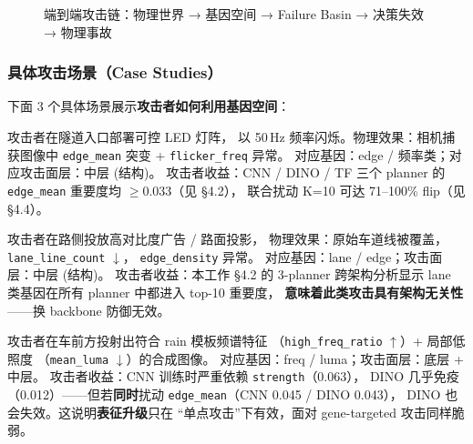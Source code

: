 \documentclass[a4paper,12pt,fontset=fandol]{ctexart}
\newcommand{\gene}[1]{\texttt{#1}}
\begin{document}
\begin{figure}[H]
\caption{端到端攻击链：物理世界 → 基因空间 → Failure Basin → 决策失效 → 物理事故}
\label{fig:attack_chain}
\end{figure}

\subsubsection{具体攻击场景（Case Studies）}

\noindent 下面 3 个具体场景展示\textbf{攻击者如何利用基因空间}：

\begin{description}[leftmargin=1.4em,style=nextline]
\item[\textbf{场景 S1 — 隧道入口 LED 闪烁攻击}]
  攻击者在隧道入口部署可控 LED 灯阵，
  以 50\,Hz 频率闪烁。物理效果：相机捕获图像中
  \gene{edge\_mean} 突变 + \gene{flicker\_freq} 异常。
  对应基因：edge / 频率类；对应攻击面层：中层 (结构)。
  攻击者收益：CNN / DINO / TF 三个 planner 的
  \gene{edge\_mean} 重要度均 $\geq 0.033$（见 §4.2），
  联合扰动 K=10 可达 71--100\% flip（见 §4.4）。

\item[\textbf{场景 S2 — 路面广告覆盖车道线攻击}]
  攻击者在路侧投放高对比度广告 / 路面投影，
  物理效果：原始车道线被覆盖，\gene{lane\_line\_count} $\downarrow$，
  \gene{edge\_density} 异常。
  对应基因：lane / edge；攻击面层：中层 (结构)。
  攻击者收益：本工作 §4.2 的 3-planner 跨架构分析显示
  lane 类基因在所有 planner 中都进入 top-10 重要度，
  \textbf{意味着此类攻击具有架构无关性}——换 backbone 防御无效。

\item[\textbf{场景 S3 — 雨夜对抗贴纸 / 投影攻击}]
  攻击者在车前方投射出符合 rain 模板频谱特征
  （\gene{high\_freq\_ratio} $\uparrow$）+ 局部低照度
  （\gene{mean\_luma} $\downarrow$）的合成图像。
  对应基因：freq / luma；攻击面层：底层 + 中层。
  攻击者收益：CNN 训练时严重依赖 \gene{strength}（0.063），
  DINO 几乎免疫（0.012）——但若\textbf{同时}扰动
  \gene{edge\_mean}（CNN 0.045 / DINO 0.043），
  DINO 也会失效。这说明\textbf{表征升级}只在
  ``单点攻击''下有效，面对 gene-targeted 攻击同样脆弱。
\end{description}
\end{document}
